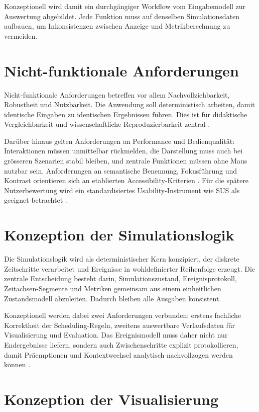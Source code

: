 Konzeptionell wird damit ein durchgängiger Workflow vom Eingabemodell zur Auswertung abgebildet. Jede Funktion muss auf denselben Simulationsdaten aufbauen, um Inkonsistenzen zwischen Anzeige und Metrikberechnung zu vermeiden.

\section{Nicht-funktionale Anforderungen}

Nicht-funktionale Anforderungen betreffen vor allem Nachvollziehbarkeit, Robustheit und Nutzbarkeit. Die Anwendung soll deterministisch arbeiten, damit identische Eingaben zu identischen Ergebnissen führen. Dies ist für didaktische Vergleichbarkeit und wissenschaftliche Reproduzierbarkeit zentral \cite{banks2010discrete}.

Darüber hinaus gelten Anforderungen an Performance und Bedienqualität: Interaktionen müssen unmittelbar rückmelden, die Darstellung muss auch bei grösseren Szenarien stabil bleiben, und zentrale Funktionen müssen ohne Maus nutzbar sein. Anforderungen an semantische Benennung, Fokusführung und Kontrast orientieren sich an etablierten Accessibility-Kriterien \cite{wcag2018}. Für die spätere Nutzerbewertung wird ein standardisiertes Usability-Instrument wie SUS als geeignet betrachtet \cite{brooke1996sus}.

\section{Konzeption der Simulationslogik}

Die Simulationslogik wird als deterministischer Kern konzipiert, der diskrete Zeitschritte verarbeitet und Ereignisse in wohldefinierter Reihenfolge erzeugt. Die zentrale Entscheidung besteht darin, Simulationszustand, Ereignisprotokoll, Zeitachsen-Segmente und Metriken gemeinsam aus einem einheitlichen Zustandsmodell abzuleiten. Dadurch bleiben alle Ausgaben konsistent.

Konzeptionell werden dabei zwei Anforderungen verbunden: erstens fachliche Korrektheit der Scheduling-Regeln, zweitens auswertbare Verlaufsdaten für Visualisierung und Evaluation. Das Ereignismodell muss daher nicht nur Endergebnisse liefern, sondern auch Zwischenschritte explizit protokollieren, damit Präemptionen und Kontextwechsel analytisch nachvollzogen werden können \cite{silberschatz2018operating,pinedo2016scheduling}.

\section{Konzeption der Visualisierung}

